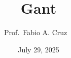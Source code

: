 \documentclass[
  12pt,
  oneside]{book}
\title{Gant}
\author{Prof.~Fabio A. Cruz ~}
\date{July 29, 2025}
\begin{document}
  \begin{frontmatter}
  \begin{titlepage}




  \BgThispage


  \begin{minipage}[b][0.78\textheight][s]{0.65\textwidth}

    \raggedright
    
    \vfill


\end{minipage}
\end{titlepage}
\end{frontmatter}
\end{document}
